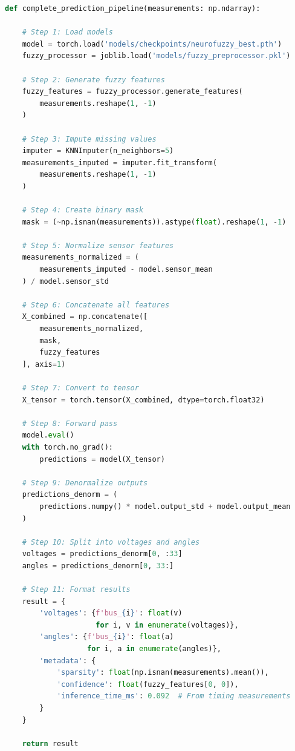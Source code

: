 \documentclass[12pt,a4paper]{report}
\begin{document}
\begin{lstlisting}[language=Python, caption={End-to-End Prediction Function}]
def complete_prediction_pipeline(measurements: np.ndarray):

    # Step 1: Load models
    model = torch.load('models/checkpoints/neurofuzzy_best.pth')
    fuzzy_processor = joblib.load('models/fuzzy_preprocessor.pkl')
    
    # Step 2: Generate fuzzy features
    fuzzy_features = fuzzy_processor.generate_features(
        measurements.reshape(1, -1)
    )
    
    # Step 3: Impute missing values
    imputer = KNNImputer(n_neighbors=5)
    measurements_imputed = imputer.fit_transform(
        measurements.reshape(1, -1)
    )
    
    # Step 4: Create binary mask
    mask = (~np.isnan(measurements)).astype(float).reshape(1, -1)
    
    # Step 5: Normalize sensor features
    measurements_normalized = (
        measurements_imputed - model.sensor_mean
    ) / model.sensor_std
    
    # Step 6: Concatenate all features
    X_combined = np.concatenate([
        measurements_normalized,
        mask,
        fuzzy_features
    ], axis=1)
    
    # Step 7: Convert to tensor
    X_tensor = torch.tensor(X_combined, dtype=torch.float32)
    
    # Step 8: Forward pass
    model.eval()
    with torch.no_grad():
        predictions = model(X_tensor)
    
    # Step 9: Denormalize outputs
    predictions_denorm = (
        predictions.numpy() * model.output_std + model.output_mean
    )
    
    # Step 10: Split into voltages and angles
    voltages = predictions_denorm[0, :33]
    angles = predictions_denorm[0, 33:]
    
    # Step 11: Format results
    result = {
        'voltages': {f'bus_{i}': float(v) 
                     for i, v in enumerate(voltages)},
        'angles': {f'bus_{i}': float(a) 
                   for i, a in enumerate(angles)},
        'metadata': {
            'sparsity': float(np.isnan(measurements).mean()),
            'confidence': float(fuzzy_features[0, 0]),
            'inference_time_ms': 0.092  # From timing measurements
        }
    }
    
    return result
\end{lstlisting}
\end{document}
